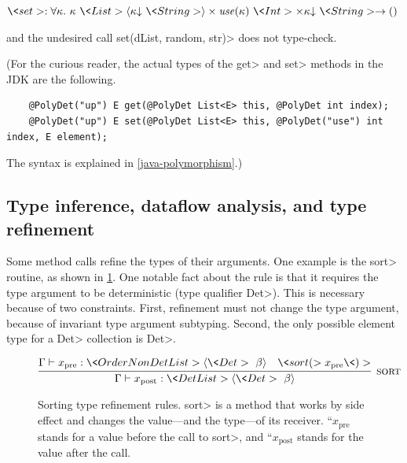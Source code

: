$\<set> : \forallt{\kappa} \kappa\ \<List>\angles{\down{\kappa}\ \<String>} \times \use{\kappa}\ \<Int> \times \down{\kappa}\ \<String> \rightarrow ()$

\noindent
and the undesired call \<set(dList, random, str)> does not type-check.

(For the curious reader, the actual types of the \<get> and \<set> methods
in the JDK are the following.

\begin{Verbatim}
    @PolyDet("up") E get(@PolyDet List<E> this, @PolyDet int index);
    @PolyDet("up") E set(@PolyDet List<E> this, @PolyDet("use") int index, E element);
\end{Verbatim}

\noindent
The syntax is explained in \cref{java-polymorphism}.)


\subsection{Type inference, dataflow analysis, and type refinement}\label{dataflow}


Some method calls refine the types of their
arguments.  One example is the \<sort> routine,
as shown in \cref{fig-sorting}.  One notable fact about the 
rule is that it requires the type argument to be deterministic (type
qualifier \<Det>).  This is necessary because of two constraints.
First, refinement must not change the type argument, because of invariant
type argument subtyping.
Second, the only possible element type for a \<Det> collection is \<Det>.


\begin{figure}
%     
    
  $\infer[\rulename{sort}]
  {\Gamma \vdash x_{\mathrm{post}} : \<Det List>\angles{\<Det>\ \beta}}
  {\Gamma \vdash x_{\mathrm{pre}} : \<OrderNonDet List>\angles{\<Det>\ \beta} & \<sort(>x_{\mathrm{pre}}\<)>}$
    
%     
    
    \caption{Sorting type refinement rules.  \<sort> is a method that works
      by side effect and changes the value---and the type---of its receiver.
    ``$x_{\mathrm{pre}}$ stands for a value before the call to \<sort>, and
      ``$x_{\mathrm{post}}$ stands for the value after the call.
    }
    \label{fig-sorting}
\end{figure}

